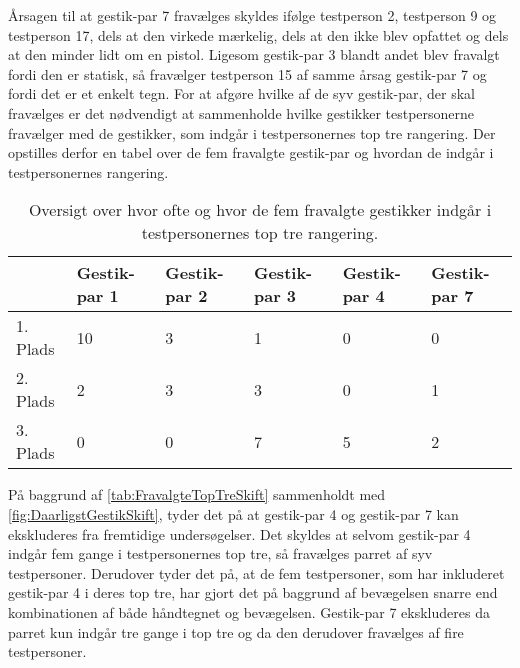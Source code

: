 Årsagen til at gestik-par 7 fravælges skyldes ifølge testperson 2, testperson 9 og testperson 17, dels at den virkede mærkelig, dels at den ikke blev opfattet og dels at den minder lidt om en pistol. Ligesom gestik-par 3 blandt andet blev fravalgt fordi den er statisk, så fravælger testperson 15 af samme årsag gestik-par 7 og fordi det er et enkelt tegn.\blankline
%
For at afgøre hvilke af de syv gestik-par, der skal fravælges er det nødvendigt at sammenholde hvilke gestikker testpersonerne fravælger med de gestikker, som indgår i testpersonernes top tre rangering. Der opstilles derfor en tabel over de fem fravalgte gestik-par og hvordan de indgår i testpersonernes rangering.    
%
\begin{table}[H]
	\centering
	\begin{tabular}{ | p{1.5cm} | p{2.1cm} | p{2.1cm} | p{2.1cm} | p{2.1cm} | p{2.1cm} |}
	\hline
		 & Gestik-par 1 & Gestik-par 2 & Gestik-par 3 & Gestik-par 4 & Gestik-par 7 \\ \hline
		1. Plads & 10 & 3 & 1 & 0 & 0\\ \hline
		2. Plads & 2 & 3 & 3 & 0 & 1\\ \hline
		3. Plads & 0 & 0 & 7 & 5 & 2\\ \hline
	\end{tabular}
	\caption{Oversigt over hvor ofte og hvor de fem fravalgte gestikker indgår i testpersonernes top tre rangering.}
	\label{tab:FravalgteTopTreSkift}
\end{table}
\noindent
%
På baggrund af \autoref{tab:FravalgteTopTreSkift} sammenholdt med \autoref{fig:DaarligstGestikSkift}, tyder det på at gestik-par 4 og gestik-par 7 kan ekskluderes fra fremtidige undersøgelser. Det skyldes at selvom gestik-par 4 indgår fem gange i testpersonernes top tre, så fravælges parret af syv testpersoner. Derudover tyder det på, at de fem testpersoner, som har inkluderet gestik-par 4 i deres top tre, har gjort det på baggrund af bevægelsen snarre end kombinationen af både håndtegnet og bevægelsen. Gestik-par 7 ekskluderes da parret kun indgår tre gange i top tre og da den derudover fravælges af fire testpersoner. 

